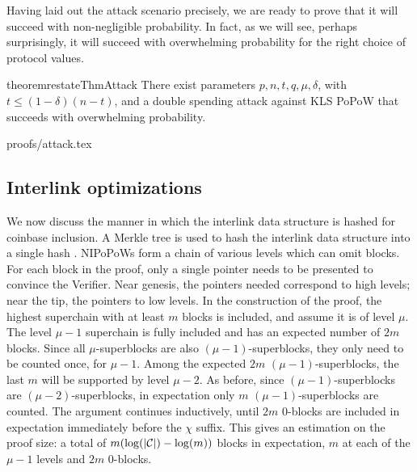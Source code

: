 Having laid out the attack scenario precisely, we are ready to prove that it
will succeed with non-negligible probability. In fact, as we will see, perhaps
surprisingly, it will succeed with overwhelming probability for the right choice
of protocol values.

\begin{restatable}{theorem}{restateThmAttack}
There exist parameters $p, n, t, q,  \mu, \delta$, with $t\leq (1-\delta)(n-t)$,
and a double spending attack against KLS PoPoW that succeeds with overwhelming
probability.
\end{restatable}
\ifonecolumn
{proofs/attack.tex}
\fi

\subsection{Interlink optimizations}
We now discuss the manner in which the interlink data structure is hashed for
coinbase inclusion. A Merkle tree is used to hash the interlink data structure
into a single hash \cite{KLS}. NIPoPoWs form a chain of various levels
which can omit blocks. For each block in the proof,
only a single pointer needs to be presented to convince the Verifier. Near
genesis, the pointers needed correspond to high levels; near
the tip, the pointers to low levels. In the construction of
the proof, the highest superchain with at least $m$ blocks is included, and
assume it is of level $\mu$. The level $\mu - 1$ superchain is fully
included and has an expected number of $2m$ blocks. Since all
$\mu$-superblocks are also $(\mu - 1)$-superblocks, they only need to be
counted once, for $\mu - 1$. Among the expected $2m$ $(\mu - 1)$-superblocks,
the last $m$ will be supported by level $\mu - 2$. As before, since $(\mu -
1)$-superblocks are $(\mu - 2)$-superblocks, in expectation only $m$
$(\mu-1)$-superblocks are counted. The argument continues inductively, until
$2m$ $0$-blocks are included in expectation immediately before the $\chi$
suffix. This gives an estimation on the proof size: a total of $m
(\log(|\mathcal{C}|) - \log(m))$ blocks in expectation, $m$ at each of the $\mu - 1$
levels and $2m$ $0$-blocks.

